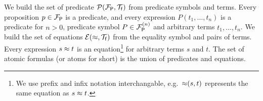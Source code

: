 
\begin{definition}\label{def:predicates}
	We build the set of {\myem predicate} ${{\mathcal P}({{\mathcal F}_{\mathsf P}},{\mathcal T}_{\mathsf f}})$
	from predicate symbols and terms. 
	Every proposition $p\in {{\mathcal F}_{\mathsf P}}$ is a predicate, 
	and every expression $P(t_1,\ldots,t_n)$ is a predicate for $n>0$,
	predicate symbol $P\in{{\mathcal F}_{\mathsf P}^{(n)}}$ and arbitrary terms $t_1,\ldots,t_n$.
%	
	We build the set of {\myem equations }${{\mathcal E}(\approx, {\mathcal T}_{\mathsf f}})$ from the equality symbol and pairs of terms.
	Every expression $s\approx t$ is an equation\footnote{
		We use prefix and infix notation interchangable, e.g.~${\approx}(s,t)$ represents the same equation as $s\approx t$.} 
	for arbitrary terms $s$ and $t$.
%	
	The set of atomic formulas (or {\myem atoms }for short) is the union of predicates and equations.
\end{definition}